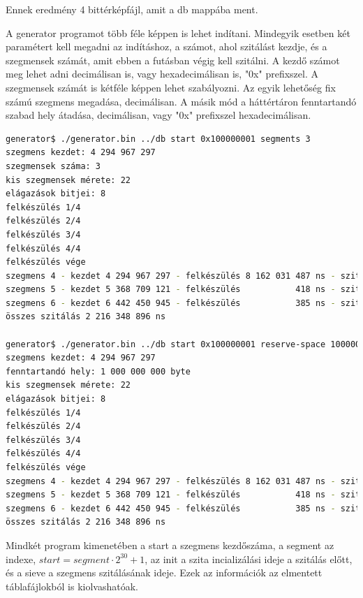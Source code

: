 \documentclass[12pt]{report}
\begin{document}
Ennek eredmény 4 bittérképfájl, amit a db mappába ment.  %

A generator programot több féle képpen is lehet indítani.
Mindegyik esetben két paramétert kell megadni az indításhoz,
a számot, ahol szitálást kezdje, és a szegmensek számát, amit
ebben a futásban végig kell szitálni.
A kezdő számot meg lehet adni decimálisan is, vagy hexadecimálisan is,
"0x" prefixszel. A szegmensek számát is kétféle képpen lehet szabályozni.
Az egyik lehetőség fix számú szegmens megadása, decimálisan.
A másik mód a háttértáron fenntartandó szabad hely átadása, decimálisan,
vagy "0x" prefixszel hexadecimálisan.  %

{\tiny
\begin{lstlisting}[language=bash]
generator$ ./generator.bin ../db start 0x100000001 segments 3
szegmens kezdet: 4 294 967 297
szegmensek száma: 3
kis szegmensek mérete: 22
elágazások bitjei: 8
felkészülés 1/4
felkészülés 2/4
felkészülés 3/4
felkészülés 4/4
felkészülés vége
szegmens 4 - kezdet 4 294 967 297 - felkészülés 8 162 031 487 ns - szitálás 729 914 370 ns
szegmens 5 - kezdet 5 368 709 121 - felkészülés           418 ns - szitálás 736 412 117 ns
szegmens 6 - kezdet 6 442 450 945 - felkészülés           385 ns - szitálás 750 022 409 ns
összes szitálás 2 216 348 896 ns

generator$ ./generator.bin ../db start 0x100000001 reserve-space 1000000000
szegmens kezdet: 4 294 967 297
fenntartandó hely: 1 000 000 000 byte 
kis szegmensek mérete: 22
elágazások bitjei: 8
felkészülés 1/4
felkészülés 2/4
felkészülés 3/4
felkészülés 4/4
felkészülés vége
szegmens 4 - kezdet 4 294 967 297 - felkészülés 8 162 031 487 ns - szitálás 729 914 370 ns
szegmens 5 - kezdet 5 368 709 121 - felkészülés           418 ns - szitálás 736 412 117 ns
szegmens 6 - kezdet 6 442 450 945 - felkészülés           385 ns - szitálás 750 022 409 ns
összes szitálás 2 216 348 896 ns
\end{lstlisting}
}

Mindkét program kimenetében a start a szegmens kezdőszáma, a segment az indexe,
$start=segment \cdot 2^{30}+1$, az init a szita incializálási ideje a szitálás előtt,
és a sieve a szegmens szitálásának ideje. Ezek az információk az elmentett
táblafájlokból is kiolvashatóak.
\end{document}
